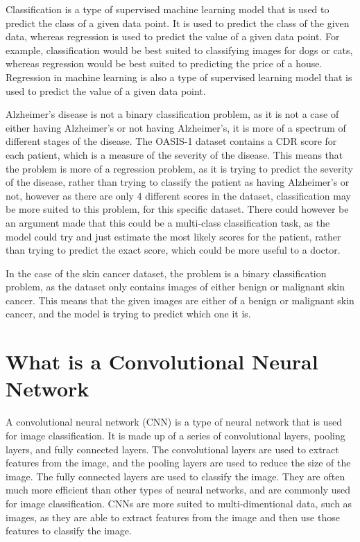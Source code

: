 \documentclass[]{final_report}
\begin{document}
Classification is a type of supervised machine learning model that is used to predict the class of a given data point. It is used to predict the class of the given data, whereas regression is used to predict the value of a given data point. For example, classification would be best suited to classifying images for dogs or cats, whereas regression would be best suited to predicting the price of a house. Regression in machine learning is also a type of supervised learning model that is used to predict the value of a given data point.

Alzheimer's disease is not a binary classification problem, as it is not a case of either having Alzheimer's or not having Alzheimer's, it is more of a spectrum of different stages of the disease. The OASIS-1 dataset contains a CDR score for each patient, which is a measure of the severity of the disease. This means that the problem is more of a regression problem, as it is trying to predict the severity of the disease, rather than trying to classify the patient as having Alzheimer's or not, however as there are only 4 different scores in the dataset, classification may be more suited to this problem, for this specific dataset. There could however be an argument made that this could be a multi-class classification task, as the model could try and just estimate the most likely scores for the patient, rather than trying to predict the exact score, which could be more useful to a doctor.

In the case of the skin cancer dataset, the problem is a binary classification problem, as the dataset only contains images of either benign or malignant skin cancer. This means that the given images are either of a benign or malignant skin cancer, and the model is trying to predict which one it is.

\section{What is a Convolutional Neural Network}
A convolutional neural network (CNN) is a type of neural network that is used for image classification. It is made up of a series of convolutional layers, pooling layers, and fully connected layers. The convolutional layers are used to extract features from the image, and the pooling layers are used to reduce the size of the image. The fully connected layers are used to classify the image. They are often much more efficient than other types of neural networks, and are commonly used for image classification. CNNs are more suited to multi-dimentional data, such as images, as they are able to extract features from the image and then use those features to classify the image.
\end{document}
